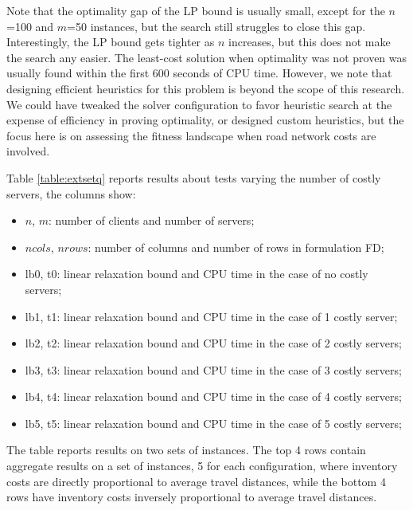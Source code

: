 \documentclass[preprint,11pt,authoryear]{elsarticle}
\begin{document}
Note that the optimality gap of the LP bound is usually small, except for the $n$=100 and $m$=50 instances, but the search still struggles to close this gap. Interestingly, the LP bound gets tighter as $n$ increases, but this does not make the search any easier.
The least-cost solution when optimality was not proven was usually found within the first 600 seconds of CPU time. However, we note that designing efficient heuristics for this problem is beyond the scope of this research. We could have tweaked the solver configuration to favor heuristic search at the expense of efficiency in proving optimality, or designed custom heuristics, but the focus here is on assessing the fitness landscape when road network costs are involved.

Table \ref{table:extsetq} reports results about tests varying the number of costly servers, the columns show:
\begin{itemize}
	\item $n$, $m$: number of clients and number of servers;
	\item $ncols$, $nrows$: number of columns and number of rows in formulation FD;
	\item lb0, t0: linear relaxation bound and CPU time in the case of no costly servers;
	\item lb1, t1: linear relaxation bound and CPU time in the case of 1 costly server;
	\item lb2, t2: linear relaxation bound and CPU time in the case of 2 costly servers;
	\item lb3, t3: linear relaxation bound and CPU time in the case of 3 costly servers;
	\item lb4, t4: linear relaxation bound and CPU time in the case of 4 costly servers;
	\item lb5, t5: linear relaxation bound and CPU time in the case of 5 costly servers;
\end{itemize}

The table reports results on two sets of instances. The top 4 rows contain aggregate results on a set of instances, 5 for each configuration, where inventory costs are directly proportional to average travel distances, while the bottom 4 rows have inventory costs inversely proportional to average travel distances.
\end{document}

